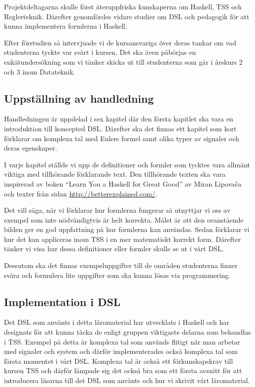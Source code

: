 \documentclass[]{article}
\begin{document}
Projektdeltagarna skulle först återuppfriska kunskaperna om Haskell, TSS
och Reglerteknik. Därefter genomfördes vidare studier om DSL och pedagogik för
att kunna implementera formlerna i Haskell.

Efter förstudien så intervjuade vi de kursansvariga över deras tankar om vad
studenterna tyckte var svårt i kursen. Det ska även påbörjas en
enkätundersökning som vi tänker skicka ut till studenterna som går i årskurs
2 och 3 inom Datateknik.


\subsection{Uppställning av handledning}

Handledningen är uppdelad i sex kapitel %
där den första kapitlet ska vara en introduktion till koncepted DSL.
Därefter ska det finnas ett kapitel som kort förklarar om komplexa tal
med Eulers formel samt olika typer av signaler och deras egenskaper.


I varje kapitel ställde vi upp de definitioner och formler som tycktes
vara allmänt viktiga med tillhörande förklarande text. Den tillhörande
texten ska vara inspirerad av boken ``Learn You a Haskell for Great
Good'' av Miran Lipovača \cite{learnyouahaskell} och texter från sidan
\url{http://betterexplained.com/}.

Det vill säga, när vi förklarar hur formlerna fungerar så utnyttjar vi
oss av exempel som inte nödvändigtvis är helt korrekta. Målet är
att den ovanstående bilden ger en god uppfattning på hur formlerna kan användas.
Sedan förklarar vi hur det kan appliceras inom TSS i en mer matematiskt korrekt
form. Därefter tänker vi visa hur dessa definitioner eller formler skulle
se ut i vårt DSL.

Dessutom ska det finnas exempeluppgifter till de områden studenterna finner
svåra och formulera lite uppgifter som ska kunna lösas via programmering.

\subsection{Implementation i DSL}
Det DSL som använts i detta läromaterial har utvecklats i Haskell och har
designats för att kunna täcka de enligt gruppen viktigaste delarna som
behandlas i TSS.
Exempel på detta är komplexa tal som används flitigt när man arbetar med
signaler och system och därför implementerades också komplexa tal som första
momentet i vårt DSL. Komplexa tal är också ett förkunskapskrav till kursen TSS
och därför lämpade sig det också bra som ett första avsnitt för att
introducera läsarna till det DSL som använts och hur vi skrivit vårt
läromaterial.
\end{document}
